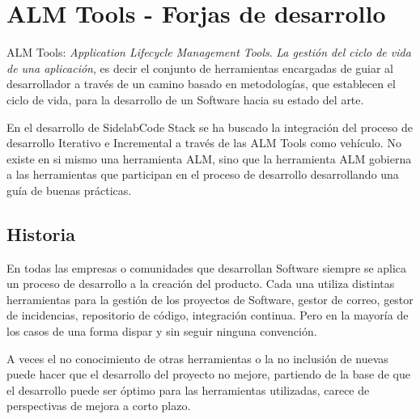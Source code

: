 \chapter{ALM Tools - Forjas de desarrollo}
\label{chap:almtools}

\begin{comment}
* ALM Tools
    * Qué es una forja
    * Objetivos
    * Componentes
        * Estudio del arte de forjas
    * Problemática -> administración, costes...
        * Tablas comparativas
    * Algunos ejemplos y sus limitaciones
    * Conclusiones del estudio de forjas
\end{comment}

\par ALM Tools: \emph{Application Lifecycle Management Tools}. \emph{La gesti\'on del ciclo de vida de una aplicaci\'on}, es decir el conjunto de herramientas encargadas de guiar al desarrollador a trav\'es de un camino basado en metodolog\'ias, que establecen el ciclo de vida, para la desarrollo de un Software hacia su estado del arte.

\par En el desarrollo de SidelabCode Stack se ha buscado la integración del proceso de desarrollo Iterativo e Incremental a trav\'es de las ALM Tools como veh\'iculo. No existe en si mismo una herramienta ALM, sino que la herramienta ALM gobierna a las herramientas que participan en el proceso de desarrollo desarrollando una guía de buenas prácticas.

\section{Historia}
\label{sec:historia}

\par En todas las empresas o comunidades que desarrollan Software siempre se aplica un proceso de desarrollo a la creación del producto. Cada una utiliza distintas herramientas para la gesti\'on de los proyectos de Software, gestor de correo, gestor de incidencias, repositorio de c\'odigo, integraci\'on continua. Pero en la mayor\'ia de los casos de una forma dispar y sin seguir ninguna convención.

\par A veces el no conocimiento de otras herramientas o la no inclusión de nuevas puede hacer que el desarrollo del proyecto no mejore, partiendo de la base de que el desarrollo puede ser óptimo para las herramientas utilizadas, carece de perspectivas de mejora a corto plazo.

